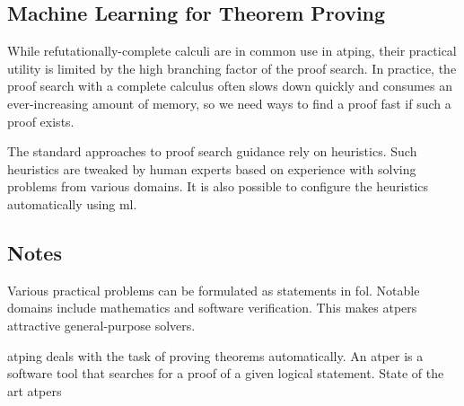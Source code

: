 \subsection{Machine Learning for Theorem Proving}

While refutationally-complete calculi are in common use in \gls{atping},
their practical utility is limited by the high branching factor of the proof search.
In practice, the proof search with a complete calculus often slows down quickly and consumes an ever-increasing amount of memory,
so we need ways to find a proof fast if such a proof exists.

The standard approaches to proof search guidance rely on heuristics.
Such heuristics are tweaked by human experts based on experience with solving problems from various domains.
It is also possible to configure the heuristics automatically using \gls{ml}.


\subsection{Notes}

Various practical problems can be formulated as statements in \gls{fol}.
Notable domains include mathematics and software verification.
This makes \glspl{atper} attractive general-purpose solvers.

\Gls{atping} deals with the task of proving theorems automatically.
An \gls{atper} is a software tool that searches for a proof of a given logical statement.
State of the art \glspl{atper}




